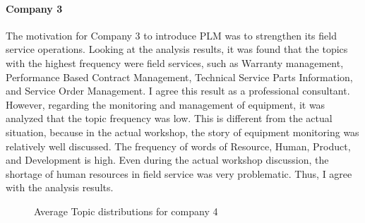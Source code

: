 \documentclass[senior]{IPSstyle}
\begin{document}
\paragraph{Company 3} The motivation for Company 3 to introduce PLM was to strengthen its field service operations. Looking at the analysis results, it was found that the topics with the highest frequency were field services, such as Warranty management, Performance Based Contract Management, Technical Service Parts Information, and Service Order Management. I agree this result as a professional consultant. However, regarding the monitoring and management of equipment, it was analyzed that the topic frequency was low. This is different from the actual situation, because in the actual workshop, the story of equipment monitoring was relatively well discussed. The frequency of words of Resource, Human, Product, and Development is high. Even during the actual workshop discussion, the shortage of human resources in field service was very problematic. Thus, I agree with the analysis results.

\begin{figure}[h]
    \begin{center}
    \end{center}
\vspace{-0.3cm}
    \caption{Average Topic distributions for company 4}
    \label{fig_c4}
    \vspace{-0.3cm}
\end{figure} 
\end{document}
